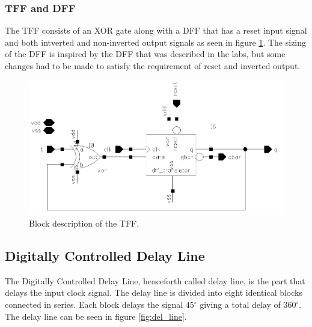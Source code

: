 \documentclass[a4paper,12pt]{article} \usepackage{graphicx}
\newcommand{\degree}{\ensuremath{^\circ}}
\begin{document}
\subsubsection{TFF and DFF}
The TFF consists of an XOR gate along with a DFF that has a reset input signal and
both intverted and non-inverted output signals as seen in figure \ref{fig:counter_TFF}. The sizing of the DFF is inspired 
by the DFF that was described in the labs, but some changes had to be made to satisfy
the requirement of reset and inverted output.

\begin{figure}[h]
        \centering
        \includegraphics[width=\textwidth]{../Bilder/counter_6bit/counter_6bit_TFF.png}
        \caption{Block description of the TFF.}
        \label{fig:counter_TFF}
\end{figure}

\clearpage

\subsection{Digitally Controlled Delay Line}
The Digitally Controlled Delay Line, henceforth called delay line, is the part
that delays the input clock signal. The delay line is divided into eight
identical blocks connected in series. Each block delays
the signal 
$45\degree$ giving a total delay of 360\degree. The delay line can be seen in
figure \ref{fig:del_line}. 
\end{document}
